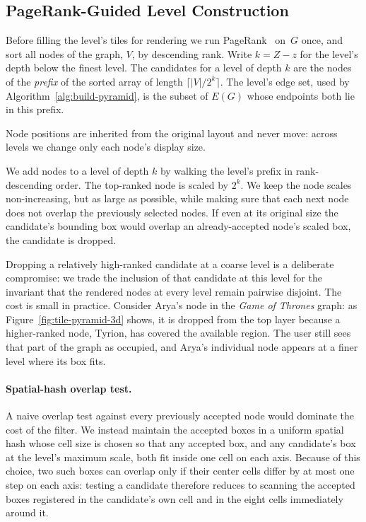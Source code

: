 \subsection{PageRank-Guided Level Construction}
\label{sec:filter}
Before filling the level's tiles for rendering we run
PageRank~\cite{page1999pagerank} on~$G$ once, and sort all nodes of
the graph, $V$, by descending rank. Write $k = Z - z$ for the
level's depth below the finest level. The candidates for a level of
depth $k$ are the nodes of the \emph{prefix} of the sorted array of
length $\lceil |V|/2^k\rceil$. The level's edge set, used by
Algorithm~\ref{alg:build-pyramid}, is the subset of $E(G)$ whose
endpoints both lie in this prefix.

Node positions are inherited from the original layout and never move:
across levels we change only each node's display size. 

We add nodes to a level of depth $k$ by walking the level's prefix in
rank-descending order. The top-ranked node is scaled by $2^k$. We keep
the node scales non-increasing, but as large as possible, while
making sure that each next node does not overlap the previously
selected nodes. If even at its original size the candidate's bounding
box would overlap an already-accepted node's scaled box, the candidate
is dropped.

Dropping a relatively high-ranked candidate at a coarse level is a
deliberate compromise: we trade the inclusion of that candidate at
this level for the invariant that the rendered nodes at every level
remain pairwise disjoint. The cost is small in practice. Consider
Arya's node in the \emph{Game of Thrones} graph: as
Figure~\ref{fig:tile-pyramid-3d} shows, it is dropped from the top
layer because a higher-ranked node, Tyrion, has covered the available
region. The user still sees that part of the graph as occupied, and
Arya's individual node appears at a finer level where its box fits.

\paragraph{Spatial-hash overlap test.}
A naive overlap test against every previously accepted node would
dominate the cost of the filter. We instead maintain the accepted
boxes in a uniform spatial hash whose cell size is chosen so that any
accepted box, and any candidate's box at the level's maximum scale,
both fit inside one cell on each axis. Because of this choice, two
such boxes can overlap only if their center cells differ by at most
one step on each axis: testing a candidate therefore reduces to
scanning the accepted boxes registered in the candidate's own cell and
in the eight cells immediately around it.

